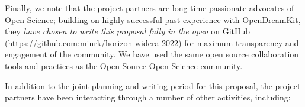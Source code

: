 % 

Finally, we note that the project partners are long time passionate
advocates of Open Science;
building on highly successful past experience with OpenDreamKit, they
\emph{have chosen to write this proposal fully in the open} on GitHub
(\href{https://github.com:minrk/horizon-widera-2022}{https://github.com:minrk/horizon-widera-2022}) for maximum transparency
and engagement of the community.
We have used the same open source collaboration tools and practices
as the Open Source Open Science community.

In addition to the joint planning and writing period for this
proposal, the project partners have been interacting through a number of
other activities, including:

